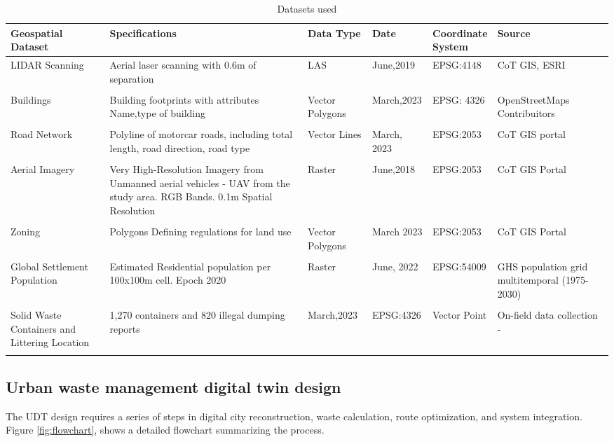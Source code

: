 \documentclass[authoryear,preprint,review,11pt,doubleblind]{elsarticle}
\begin{document}
    \begin{table}[!h]
        \caption{Datasets used}
        \scriptsize
        \label{tab:Datasets}
        \begin{tabularx}{\textwidth}{X X X X X X}
            \toprule
            Geospatial Dataset & Specifications & Data Type & Date & \shortstack{Coordinate\\ System} & Source \\
            \midrule
            LIDAR Scanning & Aerial laser scanning with 0.6m of separation & LAS & June,2019&EPSG:4148&CoT GIS, ESRI \\\\
            Buildings&Building footprints with attributes Name,type of building&Vector Polygons& March,2023&EPSG: 4326&OpenStreetMaps Contribuitors\\\\
            Road Network&Polyline of motorcar roads, including total length, road direction, road type&Vector Lines&March, 2023&EPSG:2053&CoT GIS portal\\\\
            Aerial Imagery&Very High-Resolution Imagery from Unmanned aerial vehicles - UAV from the study area. RGB Bands. 0.1m Spatial Resolution&Raster&June,2018&EPSG:2053&CoT GIS Portal\\\\
            Zoning&Polygons Defining regulations for land use&Vector Polygons&March 2023&EPSG:2053&CoT GIS Portal\\\\
            Global Settlement Population&Estimated Residential population per 100x100m cell. Epoch 2020&Raster&June, 2022&EPSG:54009&GHS population grid multitemporal (1975-2030) \citep{Schiavina2022}\\\\
            Solid Waste Containers and Littering Location&1,270 containers and 820 illegal dumping reports &March,2023&EPSG:4326&Vector Point& On-field data collection - \citep{cardenasivanSolidWasteVirtual24}\\\\
            \bottomrule
        \end{tabularx}
    \end{table}

\subsection{Urban waste management digital twin design} \label{subsec:Phase3}
    The UDT design requires a series of steps in digital city reconstruction, waste calculation, route optimization, and system integration.  Figure \ref{fig:flowchart}, shows a detailed flowchart summarizing the process.
\end{document}
